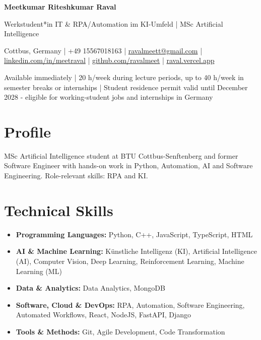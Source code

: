 \documentclass[a4paper,10pt]{article}
\begin{document}
\begin{center}
  {\LARGE\bfseries Meetkumar Riteshkumar Raval}\par\vspace{3pt}
  {\large Werkstudent*in IT \& RPA/Automation im KI-Umfeld | MSc Artificial Intelligence}\par\vspace{3pt}
  {\small Cottbus, Germany | +49 15567018163 | \href{mailto:ravalmeett@gmail.com}{ravalmeett@gmail.com} | \href{https://www.linkedin.com/in/meetraval/}{linkedin.com/in/meetraval} | \href{https://github.com/ravalmeet}{github.com/ravalmeet} | \href{https://raval.vercel.app/}{raval.vercel.app}}\par\vspace{2pt}
  {\small Available immediately | 20 h/week during lecture periods, up to 40 h/week in semester breaks or internships | Student residence permit valid until December 2028 - eligible for working-student jobs and internships in Germany}\par
\end{center}

\section*{Profile}
MSc Artificial Intelligence student at BTU Cottbus-Senftenberg and former Software Engineer with hands-on work in Python, Automation, AI and Software Engineering. Role-relevant skills: RPA and KI.\par

\section*{Technical Skills}
\begin{itemize}
\item \textbf{Programming Languages:} Python, C++, JavaScript, TypeScript, HTML
\item \textbf{AI \& Machine Learning:} Künstliche Intelligenz (KI), Artificial Intelligence (AI), Computer Vision, Deep Learning, Reinforcement Learning, Machine Learning (ML)
\item \textbf{Data \& Analytics:} Data Analytics, MongoDB
\item \textbf{Software, Cloud \& DevOps:} RPA, Automation, Software Engineering, Automated Workflows, React, NodeJS, FastAPI, Django
\item \textbf{Tools \& Methods:} Git, Agile Development, Code Transformation
\end{itemize}
\end{document}
